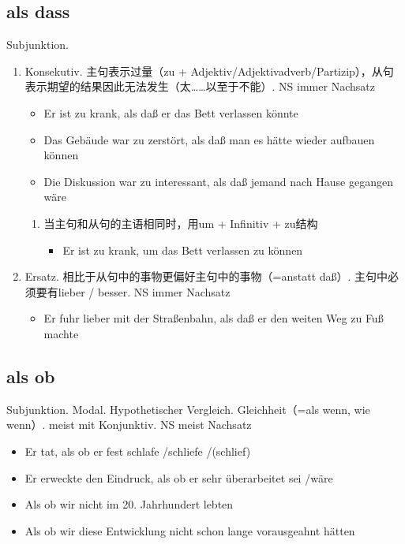\documentclass[UTF8]{report}
\begin{document}
\subsection{als dass}
Subjunktion.
\begin{enumerate}
    \item Konsekutiv. 主句表示过量（zu + Adjektiv/Adjektivadverb/Partizip），从句表示期望的结果因此无法发生（太……以至于不能）. NS immer Nachsatz
    \begin{itemize}
        \item Er ist zu krank, als daß er das Bett verlassen könnte
        \item Das Gebäude war zu zerstört, als daß man es hätte wieder aufbauen können
        \item Die Diskussion war zu interessant, als daß jemand nach Hause gegangen wäre
    \end{itemize}
    \begin{enumerate}
        \item 当主句和从句的主语相同时，用um + Infinitiv + zu结构
        \begin{itemize}
            \item Er ist zu krank, um das Bett verlassen zu können
        \end{itemize}
    \end{enumerate}
    \item Ersatz. 相比于从句中的事物更偏好主句中的事物（=anstatt daß）. 主句中必须要有lieber / besser. NS immer Nachsatz
    \begin{itemize}
        \item Er fuhr lieber mit der Straßenbahn, als daß er den weiten Weg zu Fuß machte
    \end{itemize}
\end{enumerate}

\subsection{als ob}
Subjunktion. Modal. Hypothetischer Vergleich. Gleichheit（=als wenn, wie wenn）. meist mit Konjunktiv. NS meist Nachsatz

\begin{itemize}
    \item Er tat, als ob er fest schlafe /schliefe /(schlief)
    \item Er erweckte den Eindruck, als ob er sehr überarbeitet sei /wäre
    \item Als ob wir nicht im 20. Jahrhundert lebten
    \item Als ob wir diese Entwicklung nicht schon lange vorausgeahnt hätten
\end{itemize}
\end{document}
